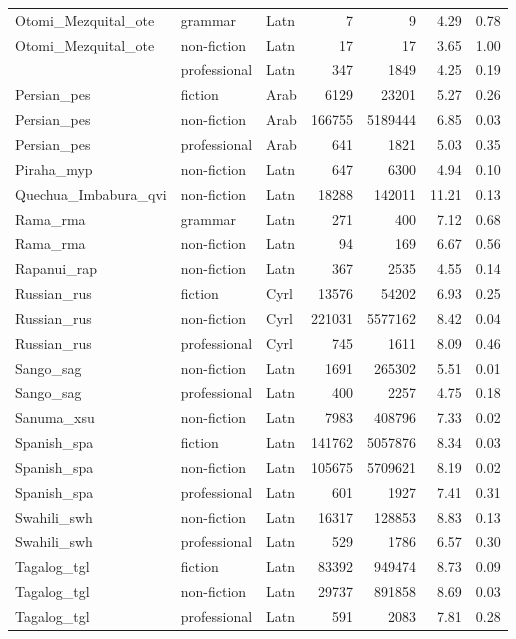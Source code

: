 \begin{longtable}{lllrrrr}
  Otomi\_Mezquital\_ote & grammar & Latn & 7 & 9 & 4.29 & 0.78 \\ 
  Otomi\_Mezquital\_ote & non-fiction & Latn & 17 & 17 & 3.65 & 1.00 \\ 
   & professional & Latn & 347 & 1849 & 4.25 & 0.19 \\ 
  Persian\_pes & fiction & Arab & 6129 & 23201 & 5.27 & 0.26 \\ 
  Persian\_pes & non-fiction & Arab & 166755 & 5189444 & 6.85 & 0.03 \\ 
  Persian\_pes & professional & Arab & 641 & 1821 & 5.03 & 0.35 \\ 
  Piraha\_myp & non-fiction & Latn & 647 & 6300 & 4.94 & 0.10 \\ 
  Quechua\_Imbabura\_qvi & non-fiction & Latn & 18288 & 142011 & 11.21 & 0.13 \\ 
  Rama\_rma & grammar & Latn & 271 & 400 & 7.12 & 0.68 \\ 
  Rama\_rma & non-fiction & Latn & 94 & 169 & 6.67 & 0.56 \\ 
  Rapanui\_rap & non-fiction & Latn & 367 & 2535 & 4.55 & 0.14 \\ 
  Russian\_rus & fiction & Cyrl & 13576 & 54202 & 6.93 & 0.25 \\ 
  Russian\_rus & non-fiction & Cyrl & 221031 & 5577162 & 8.42 & 0.04 \\ 
  Russian\_rus & professional & Cyrl & 745 & 1611 & 8.09 & 0.46 \\ 
  Sango\_sag & non-fiction & Latn & 1691 & 265302 & 5.51 & 0.01 \\ 
  Sango\_sag & professional & Latn & 400 & 2257 & 4.75 & 0.18 \\ 
  Sanuma\_xsu & non-fiction & Latn & 7983 & 408796 & 7.33 & 0.02 \\ 
  Spanish\_spa & fiction & Latn & 141762 & 5057876 & 8.34 & 0.03 \\ 
  Spanish\_spa & non-fiction & Latn & 105675 & 5709621 & 8.19 & 0.02 \\ 
  Spanish\_spa & professional & Latn & 601 & 1927 & 7.41 & 0.31 \\ 
  Swahili\_swh & non-fiction & Latn & 16317 & 128853 & 8.83 & 0.13 \\ 
  Swahili\_swh & professional & Latn & 529 & 1786 & 6.57 & 0.30 \\ 
  Tagalog\_tgl & fiction & Latn & 83392 & 949474 & 8.73 & 0.09 \\ 
  Tagalog\_tgl & non-fiction & Latn & 29737 & 891858 & 8.69 & 0.03 \\ 
  Tagalog\_tgl & professional & Latn & 591 & 2083 & 7.81 & 0.28 \\ 

\end{longtable}
